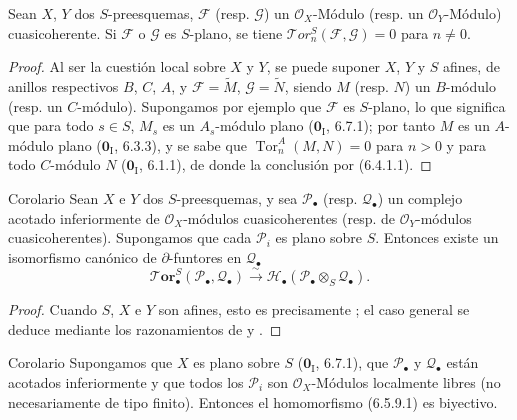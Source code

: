 \begin{proposition}[6.5.8]
Sean $X$, $Y$ dos $S$-preesquemas, $\mathscr F$ \textup{(resp.} $\mathscr G$\textup{)} un
$\mathscr O_X$-Módulo \textup{(resp.} un $\mathscr O_Y$-Módulo\textup{)} cuasicoherente. Si
$\mathscr F$ o $\mathscr G$ es $S$-plano, se tiene
$\mathscr{T}\!or_n^S(\mathscr F,\mathscr G)=0$ para $n\neq0$.
\end{proposition}

\begin{proof}
Al ser la cuestión local sobre $X$ y $Y$, se puede suponer $X$, $Y$ y $S$
afines, de anillos respectivos $B$, $C$, $A$, y
$\mathscr F=\widetilde M$, $\mathscr G=\widetilde N$, siendo $M$ (resp. $N$)
un $B$-módulo (resp. un $C$-módulo). Supongamos por ejemplo que $\mathscr F$
es $S$-plano, lo que significa que para todo $s\in S$, $M_s$ es un
$A_s$-módulo plano ($\mathbf{0}_{\mathrm I}$, 6.7.1); por tanto $M$ es un $A$-módulo plano
($\mathbf{0}_{\mathrm I}$, 6.3.3), y se sabe que
$\operatorname{Tor}_n^A(M,N)=0$ para $n>0$ y para todo $C$-módulo $N$
($\mathbf{0}_{\mathrm I}$, 6.1.1), de donde la conclusión por (6.4.1.1).
\end{proof}

\begin{namedtheorem}[6.5.9]{Corolario}
\label{III.6.5.9}
Sean $X$ e $Y$ dos $S$-preesquemas, y sea $\mathscr P_\bullet$
\textup{(resp.} $\mathscr Q_\bullet$\textup{)} un complejo
acotado
inferiormente de $\mathscr O_X$-módulos cuasicoherentes
\textup{(resp.} de $\mathscr O_Y$-módulos cuasicoherentes\textup{)}.
Supongamos que cada $\mathscr P_i$ es plano sobre $S$. Entonces existe
un isomorfismo canónico de $\partial$-funtores en $\mathscr Q_\bullet$
\[
  \boldsymbol{\mathscr{T}\!or}_\bullet^S(\mathscr P_\bullet,\mathscr Q_\bullet)
  \xrightarrow{\sim}
  \mathscr H_\bullet(\mathscr P_\bullet\otimes_S\mathscr Q_\bullet).
  \tag{6.5.9.1}\label{III.6.5.9.1.fr}
\]
\end{namedtheorem}

\begin{proof}
Cuando $S$, $X$ e $Y$ son afines, esto es precisamente
; el caso general se deduce mediante los
razonamientos de  y .
\end{proof}

\begin{namedtheorem}[6.5.10]{Corolario}
Supongamos que $X$ es plano sobre $S$ \textup{($\mathbf{0}_{\mathrm I}$, 6.7.1)}, que
$\mathscr P_\bullet$ y $\mathscr Q_\bullet$ están acotados inferiormente y
que todos los $\mathscr P_i$ son $\mathscr O_X$-Módulos localmente
libres (no necesariamente de tipo finito). Entonces el homomorfismo \textup{(6.5.9.1)} es
biyectivo.
\end{namedtheorem}


